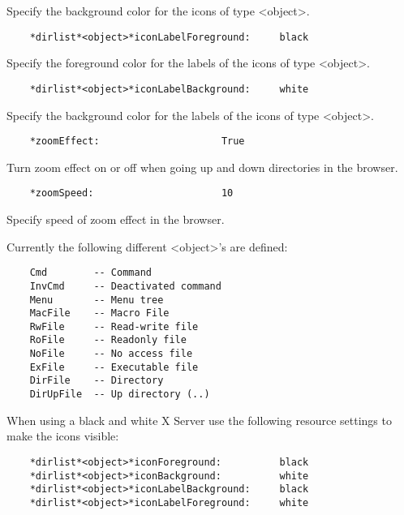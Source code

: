    Specify the background color for the icons of type <object>.

\begin{verbatim}
    *dirlist*<object>*iconLabelForeground:     black
\end{verbatim}

   Specify the foreground color for the labels of the icons of type <object>.

\begin{verbatim}
    *dirlist*<object>*iconLabelBackground:     white
\end{verbatim}

   Specify the background color for the labels of the icons of type <object>.

\begin{verbatim}
    *zoomEffect:                     True
\end{verbatim}

   Turn zoom effect on or off when going up and down directories in the
   browser.

\begin{verbatim}
    *zoomSpeed:                      10
\end{verbatim}

   Specify speed of zoom effect in the browser.

   Currently the following different <object>'s are defined:

\begin{verbatim}
    Cmd        -- Command
    InvCmd     -- Deactivated command
    Menu       -- Menu tree
    MacFile    -- Macro File
    RwFile     -- Read-write file
    RoFile     -- Readonly file
    NoFile     -- No access file
    ExFile     -- Executable file
    DirFile    -- Directory
    DirUpFile  -- Up directory (..)
\end{verbatim}

   When using a black and white X Server use the following resource settings
   to make the icons visible:

\begin{verbatim}
    *dirlist*<object>*iconForeground:          black
    *dirlist*<object>*iconBackground:          white
    *dirlist*<object>*iconLabelBackground:     black
    *dirlist*<object>*iconLabelForeground:     white
\end{verbatim}

